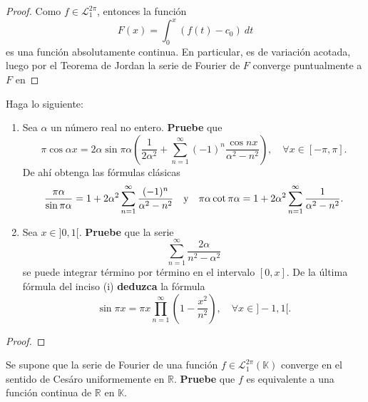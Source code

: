\documentclass[12pt]{report}
\theoremstyle{largebreak}
\begin{document}
    \begin{proof}
        Como $f\in\mathcal{L}_1^{2\pi}$, entonces la función
        \begin{equation*}
            F(x)=\int_{0}^{x}\left(f(t)-c_0 \right)\:dt
        \end{equation*}
        es una función absolutamente continua. En particular, es de variación acotada, luego por el Teorema de Jordan la serie de Fourier de $F$ converge puntualmente a $F$ en 
    \end{proof}

    \begin{excer}
        Haga lo siguiente:
        \begin{enumerate}
            \item Sea $\alpha$ un número real no entero. \textbf{Pruebe} que
            \begin{equation*}
                \pi\cos\alpha x=2\alpha\sin\pi\alpha\left(\frac{1}{2\alpha^2}+\sum_{ n=1}^\infty(-1)^n\frac{\cos nx}{\alpha^2-n^2} \right),\quad\forall x\in[-\pi,\pi].
            \end{equation*}
            De ahí obtenga las fórmulas clásicas
            \begin{equation*}
                \frac{\pi\alpha}{\sin\pi\alpha}=1+2\alpha^2\sum_{ n=1}^\infty\frac{(-1)^n}{\alpha^2-n^2}\quad\textup{y}\quad\pi\alpha\cot\pi\alpha=1+2\alpha^2\sum_{ n=1}^\infty\frac{1}{\alpha^2-n^2}.
            \end{equation*}
            \item Sea $x\in]0,1[$. \textbf{Pruebe} que la serie
            \begin{equation*}
                \sum_{ n=1}^\infty\frac{2\alpha}{n^2-\alpha^2}
            \end{equation*}
            se puede integrar término por término en el intervalo $[0,x]$. De la última fórmula del inciso (i) \textbf{deduzca} la fórmula
            \begin{equation*}
                \sin\pi x=\pi x\prod_{ n=1}^\infty\left(1-\frac{x^2}{n^2} \right),\quad\forall x\in]-1,1[.
            \end{equation*}
        \end{enumerate}
    \end{excer}

    \begin{proof}
        
    \end{proof}

    \begin{excer}
        Se supone que la serie de Fourier de una función $f\in\mathcal{L}_1^{2\pi}(\mathbb{K})$ converge en el sentido de Cesáro uniformemente en $\mathbb{R}$. \textbf{Pruebe} que $f$ es equivalente a una función continua de $\mathbb{R}$ en $\mathbb{K}$.
    \end{excer}
\end{document}
